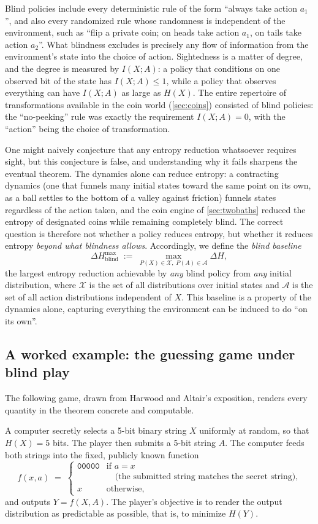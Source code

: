 \documentclass[11pt]{article}
\begin{document}
Blind policies include every deterministic rule of the form ``always take action $a_1$'', and also every randomized rule whose randomness is independent of the environment, such as ``flip a private coin; on heads take action $a_1$, on tails take action $a_2$''. What blindness excludes is precisely any flow of information from the environment's state into the choice of action. Sightedness is a matter of degree, and the degree is measured by $I(X;A)$: a policy that conditions on one observed bit of the state has $I(X;A) \le 1$, while a policy that observes everything can have $I(X;A)$ as large as $H(X)$. The entire repertoire of transformations available in the coin world (\cref{sec:coins}) consisted of blind policies: the ``no-peeking'' rule was exactly the requirement $I(X;A) = 0$, with the ``action'' being the choice of transformation.

One might naively conjecture that any entropy reduction whatsoever requires sight, but this conjecture is false, and understanding why it fails sharpens the eventual theorem. The dynamics alone can reduce entropy: a contracting dynamics (one that funnels many initial states toward the same point on its own, as a ball settles to the bottom of a valley against friction) funnels states regardless of the action taken, and the coin engine of \cref{sec:twobaths} reduced the entropy of designated coins while remaining completely blind. The correct question is therefore not whether a policy reduces entropy, but whether it reduces entropy \emph{beyond what blindness allows}. Accordingly, we define the \emph{blind baseline}
\[
\Delta H^{\max}_{\text{blind}} \;:=\; \max_{P(X) \in \mathcal{X},\; P(A) \in \mathcal{A}} \Delta H,
\]
the largest entropy reduction achievable by \emph{any} blind policy from \emph{any} initial distribution, where $\mathcal{X}$ is the set of all distributions over initial states and $\mathcal{A}$ is the set of all action distributions independent of $X$. This baseline is a property of the dynamics alone, capturing everything the environment can be induced to do ``on its own''.

\subsection{A worked example: the guessing game under blind play}
\label{sec:gameblind}

The following game, drawn from Harwood and Altair's exposition, renders every quantity in the theorem concrete and computable.

A computer secretly selects a 5-bit binary string $X$ uniformly at random, so that $H(X) = 5$ bits. The player then submits a 5-bit string $A$. The computer feeds both strings into the fixed, publicly known function
\[
f(x, a) \;=\;
\begin{cases}
\texttt{00000} & \text{if } a = x\\
 & \quad \text{(the submitted string matches the secret string)},\\[2pt]
x & \text{otherwise},
\end{cases}
\]
and outputs $Y = f(X, A)$. The player's objective is to render the output distribution as predictable as possible, that is, to minimize $H(Y)$.
\end{document}
